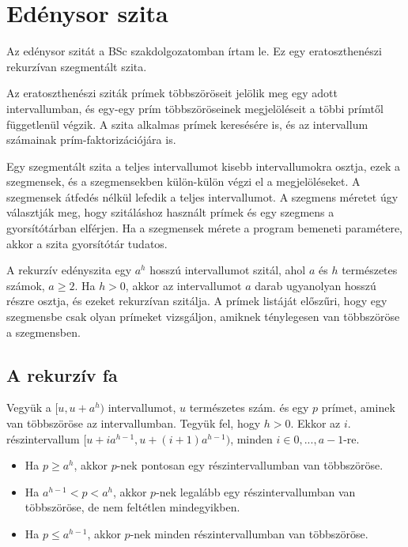 \documentclass[12pt]{report}
\begin{document}
\section{Edénysor szita}

Az edénysor szitát a BSc szakdolgozatomban írtam le.
Ez egy eratoszthenészi rekurzívan szegmentált szita.

Az eratoszthenészi sziták prímek többszöröseit jelölik meg
egy adott intervallumban,
és egy-egy prím többszöröseinek megjelöléseit
a többi prímtől függetlenül végzik.
A szita alkalmas prímek keresésére is,
és az intervallum számainak prím-faktorizációjára is.

Egy szegmentált szita a teljes intervallumot kisebb intervallumokra osztja,
ezek a szegmensek, és a szegmensekben külön-külön végzi el a megjelöléseket.
A szegmensek átfedés nélkül lefedik a teljes intervallumot.
A szegmens méretet úgy választják meg,
hogy szitáláshoz használt prímek és egy szegmens a gyorsítótárban elférjen.
Ha a szegmensek mérete a program bemeneti paramétere,
akkor a szita gyorsítótár tudatos.

A rekurzív edényszita egy $a^h$ hosszú intervallumot szitál,
ahol $a$ és $h$ természetes számok, $a \ge 2$.
Ha $h > 0$, akkor az intervallumot $a$ darab ugyanolyan hosszú részre osztja,
és ezeket rekurzívan szitálja.
A prímek listáját előszűri, hogy egy szegmensbe csak olyan prímeket vizsgáljon,
amiknek ténylegesen van többszöröse a szegmensben.

\subsection{A rekurzív fa}

Vegyük a $[u, u+a^h)$ intervallumot, $u$ természetes szám.
és egy $p$ prímet, aminek van többszöröse az intervallumban.
Tegyük fel, hogy $h>0$.
Ekkor az $i$. részintervallum $[u+ia^{h-1}, u+(i+1)a^{h-1})$,
minden $i \in {0, ..., a-1}$-re.
\begin{itemize}
\item Ha $p \ge a^h$, akkor $p$-nek pontosan egy részintervallumban van többszöröse.
\item Ha $a^{h-1} < p < a^h$, akkor $p$-nek legalább egy részintervallumban van többszöröse,
de nem feltétlen mindegyikben.
\item Ha $p \le a^{h-1}$, akkor $p$-nek minden részintervallumban van többszöröse.
\end{itemize}
\end{document}
